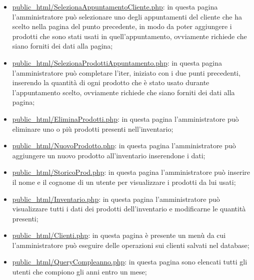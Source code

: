 {\begin{itemize}
		\item \href{http://tecnologie-web.studenti.math.unipd.it/tecweb/~pgabelli/public\_html/SelezionaAppuntamentoCliente.php}{public\_html/SelezionaAppuntamentoCliente.php}: in questa pagina l'amministratore può selezionare uno degli appuntamenti del cliente che ha scelto nella pagina del punto precedente, in modo da poter aggiungere i prodotti che sono stati usati in quell'appuntamento, ovviamente richiede che siano forniti dei dati alla pagina;
		\item \href{http://tecnologie-web.studenti.math.unipd.it/tecweb/~pgabelli/public\_html/SelezionaProdottiAppuntamento.php}{public\_html/SelezionaProdottiAppuntamento.php}: in questa pagina l'amministratore può completare l'iter, iniziato con i due punti precedenti, inserendo la quantità di ogni prodotto che è stato usato durante l'appuntamento scelto, ovviamente richiede che siano forniti dei dati alla pagina;
		\item \href{http://tecnologie-web.studenti.math.unipd.it/tecweb/~pgabelli/public\_html/EliminaProdotti.php}{public\_html/EliminaProdotti.php}: in questa pagina l'amministratore può eliminare uno o più prodotti presenti nell'inventario;
		\item \href{http://tecnologie-web.studenti.math.unipd.it/tecweb/~pgabelli/public\_html/NuovoProdotto.php}{public\_html/NuovoProdotto.php}: in questa pagina l'amministratore può aggiungere un nuovo prodotto all'inventario inserendone i dati;
		\item \href{http://tecnologie-web.studenti.math.unipd.it/tecweb/~pgabelli/public\_html/StoricoProd.php}{public\_html/StoricoProd.php}: in questa pagina l'amministratore può inserire il nome e il cognome di un utente per visualizzare i prodotti da lui usati;
		\item \href{http://tecnologie-web.studenti.math.unipd.it/tecweb/~pgabelli/public\_html/Inventario.php}{public\_html/Inventario.php}: in questa pagina l'amministratore può visualizzare tutti i dati dei prodotti dell'inventario e modificarne le quantità presenti;
		\item \href{http://tecnologie-web.studenti.math.unipd.it/tecweb/~pgabelli/public\_html/Clienti.php}{public\_html/Clienti.php}: in questa pagina è presente un menù da cui l'amministratore può eseguire delle operazioni sui clienti salvati nel database;
		\item \href{http://tecnologie-web.studenti.math.unipd.it/tecweb/~pgabelli/public\_html/QueryCompleanno.php}{public\_html/QueryCompleanno.php}: in questa pagina sono elencati tutti gli utenti che compiono gli anni entro un mese;

\end{itemize}}
